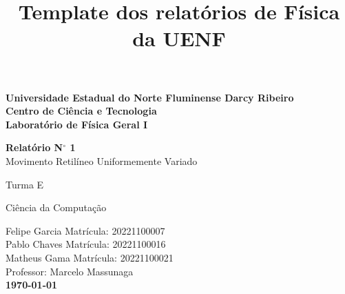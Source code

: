 \documentclass[a4paper,openany,oneside]{abntex2}
\begin{document}
\title{Template dos relatórios de Física da UENF}



\begin{center}
\hfill
\begin{minipage}[b]{0.80\textwidth}
  \textbf{\Large Universidade Estadual do Norte Fluminense Darcy Ribeiro}\\
  \centering
    \textbf{\Large Centro de Ciência e Tecnologia}\\
  \textbf{\large Laboratório de Física Geral I}
\end{minipage}
\vspace{180pt}

        \huge{\textbf{Relatório N$^\circ$ 1}}\\ %
        \Large{Movimento Retilíneo Uniformemente Variado}\\ %
        
        \vspace{100pt}
        
        \hfill Turma E 
        
        \vspace{10pt}
        
        \hfill Ciência da Computação
        
        \vspace{30pt} %

    
        \hfill Felipe Garcia \hspace{20pt} Matrícula: 20221100007  \\
        \hfill Pablo Chaves  \hspace{20pt} Matrícula: 20221100016  \\
        \hfill Matheus Gama   \hspace{20pt} Matrícula: 20221100021\\

        \vspace{30pt}
        \hfill {Professor: Marcelo Massunaga}\\ %
        
     
        \vspace{\fill}
        \LARGE \textbf{\today}
          
	\end{center}
\end{document}
